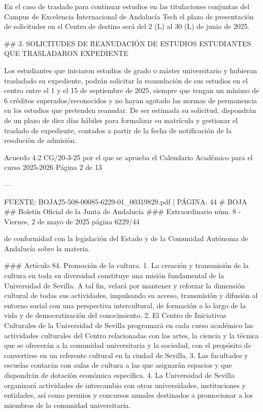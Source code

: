\documentclass{article}
\begin{document}
\begin{itemize}
\begin{itemize}
\begin{scriptsize}
                  En el caso de traslado para continuar estudios en las titulaciones conjuntas del Campus de Excelencia Internacional de Andalucía Tech el plazo de presentación de solicitudes en el Centro de destino será del 2 (L) al 30 (L) de junio de 2025.

                  \#\# 3. SOLICITUDES DE REANUDACIÓN DE ESTUDIOS ESTUDIANTES QUE TRASLADARON EXPEDIENTE

                  Los estudiantes que iniciaron estudios de grado o máster universitario y hubieran trasladado su expediente, podrán solicitar la reanudación de sus estudios en el centro entre el 1 y el 15 de septiembre de 2025, siempre que tengan un mínimo de 6 créditos superados/reconocidos y no hayan agotado las normas de permanencia en los estudios que pretenden reanudar. De ser estimada su solicitud, dispondrán de un plazo de diez días hábiles para formalizar su matrícula y gestionar el traslado de expediente, contados a partir de la fecha de notificación de la resolución de admisión.

                  Acuerdo 4.2 CG/20-3-25 por el que se aprueba el Calendario Académico para el curso 2025-2026  Página 2 de 13

                  ---

                  FUENTE: BOJA25-508-00085-6229-01\_00319829.pdf | PÁGINA: 44
                  \# BOJA
                  \#\# Boletín Oficial de la Junta de Andalucía
                  \#\#\# Extraordinario núm. 8 - Viernes, 2 de mayo de 2025
                  página 6229/44

                  de conformidad con la legislación del Estado y de la Comunidad Autónoma de Andalucía sobre la materia.

                  \#\#\# Artículo 84. Promoción de la cultura.
                  1. La creación y transmisión de la cultura en toda su diversidad constituye una misión fundamental de la Universidad de Sevilla. A tal fin, velará por mantener y reforzar la dimensión cultural de todas sus actividades, impulsando su acceso, transmisión y difusión al entorno social con una perspectiva intercultural, de formación a lo largo de la vida y de democratización del conocimiento.
                  2. El Centro de Iniciativas Culturales de la Universidad de Sevilla programará en cada curso académico las actividades culturales del Centro relacionadas con las artes, la ciencia y la técnica que se ofrecerán a la comunidad universitaria y la sociedad, con el propósito de convertirse en un referente cultural en la ciudad de Sevilla.
                  3. Las facultades y escuelas contarán con aulas de cultura a las que asignarán espacios y que dispondrán de dotación económica específica.
                  4. La Universidad de Sevilla organizará actividades de intercambio con otras universidades, instituciones y entidades, así como premios y concursos anuales destinados a promocionar a los miembros de la comunidad universitaria.


\end{scriptsize}
\end{itemize}
\end{itemize}
\end{document}
